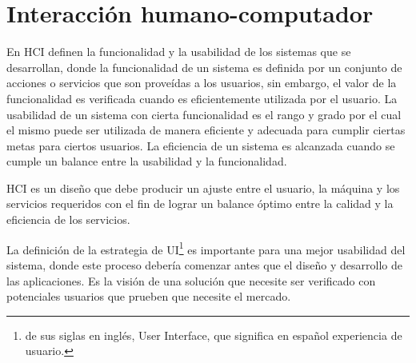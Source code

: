\section{Interacción humano-computador}
En HCI definen la funcionalidad y la usabilidad de los sistemas que se desarrollan, donde la funcionalidad de un sistema es definida por un conjunto de acciones o servicios que son proveídas a los usuarios, sin embargo, el valor de la funcionalidad es verificada cuando es eficientemente utilizada por el usuario\citep{shneiderman_designing_2010}. La usabilidad de un sistema con cierta funcionalidad es el rango y grado por el cual el mismo puede ser utilizada de manera eficiente y adecuada para cumplir ciertas metas para ciertos usuarios. La eficiencia de un sistema es alcanzada cuando se cumple un balance entre la usabilidad y la funcionalidad\citep{nielsen_usability_2010}.

HCI es un diseño que debe producir un ajuste entre el usuario, la máquina y los servicios requeridos con el fin de lograr un balance óptimo entre la calidad y la eficiencia de los servicios.

La definición de la estrategia de UI\footnote{de sus siglas en inglés, User Interface, que significa en español experiencia de usuario.} es importante para una mejor usabilidad del sistema, donde este proceso debería comenzar antes que el diseño y desarrollo de las aplicaciones. Es la visión de una solución que necesite ser verificado con potenciales usuarios que prueben que necesite el mercado\citep{levy_ux_2015}.